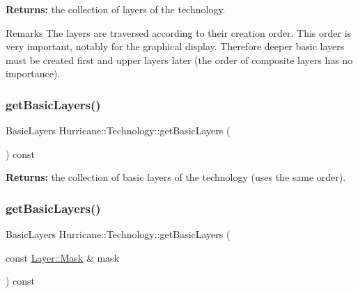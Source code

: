 {\bfseries Returns\+:} the collection of layers of the technology.

\begin{DoxyRemark}{Remarks}
The layers are traversed according to their creation order. This order is very important, notably for the graphical display. Therefore deeper basic layers must be created first and upper layers later (the order of composite layers has no importance). 
\end{DoxyRemark}
\mbox{\label{classHurricane_1_1Technology_a7fccff9da6604fafb90408ba56184fc0}} 
\subsubsection{\texorpdfstring{get\+Basic\+Layers()}{getBasicLayers()}\hspace{0.1cm}{\footnotesize\ttfamily [1/2]}}
{\footnotesize\ttfamily Basic\+Layers Hurricane\+::\+Technology\+::get\+Basic\+Layers (\begin{DoxyParamCaption}{ }\end{DoxyParamCaption}) const}

{\bfseries Returns\+:} the collection of basic layers of the technology (uses the same order). \mbox{\label{classHurricane_1_1Technology_a997457824046ea63eba51210a8e23f85}} 
\subsubsection{\texorpdfstring{get\+Basic\+Layers()}{getBasicLayers()}\hspace{0.1cm}{\footnotesize\ttfamily [2/2]}}
{\footnotesize\ttfamily Basic\+Layers Hurricane\+::\+Technology\+::get\+Basic\+Layers (\begin{DoxyParamCaption}\item[{const \mbox{\hyperlink{classHurricane_1_1Layer_af5277c670637bd5d910237e7afe01a91}{Layer\+::\+Mask}} \&}]{mask }\end{DoxyParamCaption}) const}

